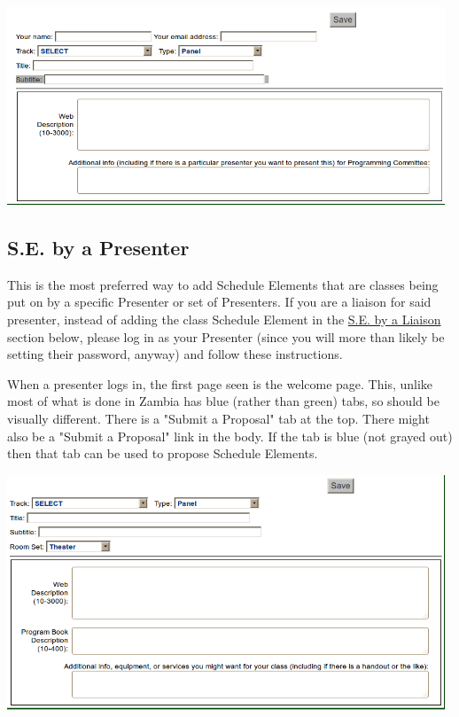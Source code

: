 \documentclass[captions=tablesignature]{scrartcl}
\begin{document}
\includegraphics[width=0.98\textwidth]{./Images/Brainstorm_New_Session.png}
\subsection{S.E. by a Presenter}
\label{sec-5-2}
This is the most preferred way to add Schedule Elements that are
classes being put on by a specific Presenter or set of Presenters.
If you are a liaison for said presenter, instead of adding the
class Schedule Element in the \hyperref[sec-5-3]{S.E. by a Liaison} section below,
please log in as your Presenter (since you will more than likely be
setting their password, anyway) and follow these instructions.

When a presenter logs in, the first page seen is the welcome page.
This, unlike most of what is done in Zambia has blue (rather than
green) tabs, so should be visually different.  There is a "Submit a
Proposal" tab at the top.  There might also be a "Submit a
Proposal" link in the body.  If the tab is blue (not grayed out)
then that tab can be used to propose Schedule Elements.

\includegraphics[width=0.98\textwidth]{./Images/Propose_Session.png}
\end{document}
